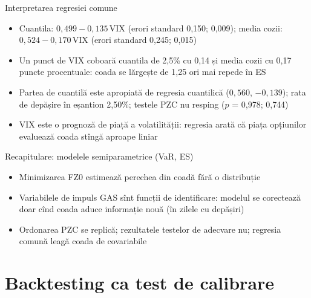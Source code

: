 \begin{frame}{Interpretarea regresiei comune}
\itemsize{\small}
\begin{itemize}
    \item Cuantila: $0{,}499 \ensuremath{-}0{,}135\,\mathrm{VIX}$ (erori standard 0{,}150; 0{,}009); media cozii: $0{,}524 \ensuremath{-}0{,}170\,\mathrm{VIX}$ (erori standard 0{,}245; 0{,}015)
    \item Un punct de VIX coboară cuantila de 2,5\% cu 0{,}14 și media cozii cu 0{,}17 puncte procentuale: coada se lărgește de 1{,}25 ori mai repede în ES
    \item Partea de cuantilă este apropiată de regresia cuantilică ($0{,}560$, $\ensuremath{-}0{,}139$); rata de depășire în eșantion 2{,}50\%; testele PZC nu resping ($p$ = 0{,}978; 0{,}744)
    \item VIX este o prognoză de piață a volatilității: regresia arată că piața opțiunilor evaluează coada stîngă aproape liniar
\end{itemize}
\end{frame}

\begin{frame}{Recapitulare: modelele semiparametrice (VaR, ES)}
\itemsize{\small}
\begin{itemize}
    \item Minimizarea FZ0 estimează perechea din coadă fără o distribuție
    \item Variabilele de impuls GAS sînt funcții de identificare: modelul se corectează doar cînd coada aduce informație nouă (în zilele cu depășiri)
    \item Ordonarea PZC se replică; rezultatele testelor de adecvare nu; regresia comună leagă coada de covariabile
\end{itemize}
\end{frame}


\section{Backtesting ca test de calibrare}


